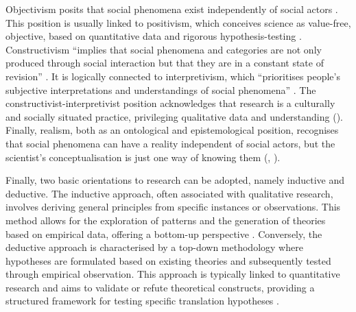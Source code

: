 Objectivism posits that social phenomena exist independently of social actors \citep[33]{bryman2016social}. This position is usually linked to positivism, which conceives science as value-free, objective, based on quantitative data and rigorous hypothesis-testing \citep[28]{bryman2016social}. Constructivism ``implies that social phenomena and categories are not only produced through social interaction but that they are in a constant state of revision'' \citep[33]{bryman2016social}. It is logically connected to interpretivism, which ``prioritises people’s subjective interpretations and understandings of social phenomena'' \citep[28]{matthews2010research}. The constructivist-interpretivist position acknowledges that research is a culturally and socially situated practice, privileging qualitative data and understanding (\cite[30]{bryman2016social}). Finally, realism, both as an ontological and epistemological position, recognises that social phenomena can have a reality independent of social actors, but the scientist’s conceptualisation is just one way of knowing them (\cite[11]{saldanha2014research}, \cite[29]{bryman2016social}).

Finally, two basic orientations to research can be adopted, namely inductive and deductive. The inductive approach, often associated with qualitative research, involves deriving general principles from specific instances or observations. This method allows for the exploration of patterns and the generation of theories based on empirical data, offering a bottom-up perspective \citep[14-15]{saldanha2014research}. Conversely, the deductive approach is characterised by a top-down methodology where hypotheses are formulated based on existing theories and subsequently tested through empirical observation. This approach is typically linked to quantitative research and aims to validate or refute theoretical constructs, providing a structured framework for testing specific translation hypotheses \citep[14--15]{saldanha2014research}.

